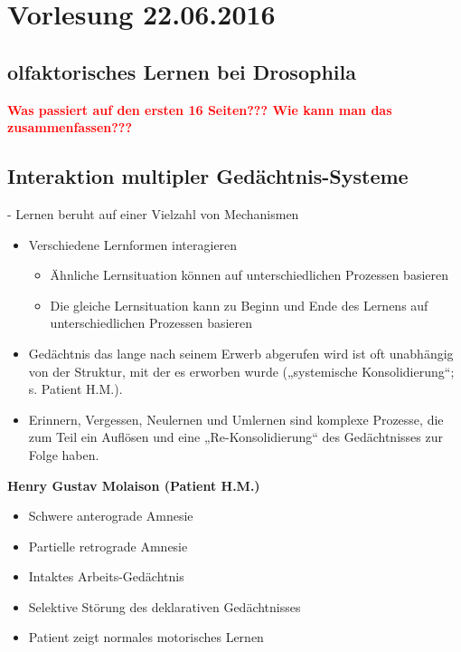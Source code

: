 \section{Vorlesung 22.06.2016}

\subsection{olfaktorisches Lernen bei Drosophila}

\textcolor{red}{\textbf{Was passiert auf den ersten 16 Seiten??? Wie kann man das zusammenfassen???}}

\subsection{Interaktion multipler Gedächtnis-Systeme}
 - Lernen beruht auf einer Vielzahl von Mechanismen\\

\begin{itemize}
	\item Verschiedene Lernformen interagieren
	\begin{itemize}
		\item Ähnliche Lernsituation können auf unterschiedlichen
Prozessen basieren
		\item Die gleiche Lernsituation kann zu Beginn und Ende des Lernens auf unterschiedlichen Prozessen basieren
	\end{itemize}
	\item Gedächtnis das lange nach seinem Erwerb abgerufen wird ist oft unabhängig von der Struktur, mit der es erworben wurde („systemische Konsolidierung“; s. Patient H.M.).
	\item Erinnern, Vergessen, Neulernen und Umlernen sind komplexe Prozesse, die zum Teil ein Auflösen und eine „Re-Konsolidierung“ des Gedächtnisses zur Folge haben.
\end{itemize}

\textbf{Henry Gustav Molaison (Patient H.M.)}
\begin{itemize}
	\item Schwere anterograde Amnesie
	\item Partielle retrograde Amnesie
	\item Intaktes Arbeits-Gedächtnis
	\item Selektive Störung des deklarativen Gedächtnisses
	\item Patient zeigt normales motorisches Lernen
\end{itemize}

